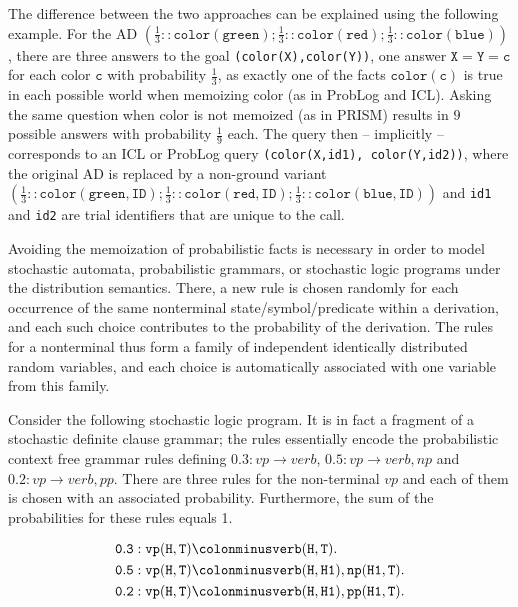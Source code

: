 \documentclass[a4paper]{article}
\begin{document}
The difference between the two approaches can be explained using the following 
example. 
For the AD $( \frac{1}{3}::\mathtt{color(green)} ;
 \frac{1}{3}::\mathtt{color(red)} ;
 \frac{1}{3}::\mathtt{color(blue)})$, there are three answers to the
 goal \texttt{(color(X),color(Y))}, one answer $\mathtt{X}=\mathtt{Y}=\mathtt{c}$ for each color
 $\mathtt{c}$ with probability $\frac{1}{3}$, as exactly one of the facts
 $\mathtt{color(c)}$ is true in each possible world when memoizing color (as in ProbLog and ICL). 
Asking the same question when color is not memoized (as in PRISM) results in $9$ possible answers with
 probability $\frac{1}{9}$ each. The query then -- implicitly --
 corresponds to an ICL or ProbLog query \texttt{(color(X,id1),
   color(Y,id2))}, where the original AD is replaced by a non-ground variant $( \frac{1}{3}::\mathtt{color(green,ID)} ;
 \frac{1}{3}::\mathtt{color(red,ID)} ;
 \frac{1}{3}::\mathtt{color(blue,ID)})$ and 
 \texttt{id1} and \texttt{id2} are trial identifiers that are unique
 to the call.

Avoiding the memoization of probabilistic facts is necessary in order to  
model stochastic automata, probabilistic grammars, or stochastic logic programs \citep{Muggleton:96} under the distribution semantics.
There, a new rule is chosen randomly for each occurrence of the same nonterminal state/symbol/predicate within a derivation, and each such choice contributes to the probability of the derivation. The rules for a nonterminal thus form a family of independent identically distributed random variables, and each choice is automatically associated with one variable from this family.

Consider the following stochastic logic program. It is in fact a fragment of a stochastic definite clause
grammar;  the rules essentially encode the probabilistic context free grammar rules defining $0.3: vp \rightarrow verb$, 
$0.5: vp \rightarrow verb, np$ and $0.2: vp \rightarrow verb, pp$. There are three rules for the non-terminal $vp$
and each of them is chosen with an associated probability. Furthermore, the sum of the probabilities for these rules equals 1.

\begin{align*}
\mathtt{0.3: vp(H,T)}&\colonminus \mathtt{  verb(H,T).}\\
\mathtt{0.5: vp(H,T)}&\colonminus \mathtt{  verb(H,H1),np(H1,T).}\\
\mathtt{0.2: vp(H,T)}&\colonminus \mathtt{  verb(H,H1),pp(H1,T).}\\
\end{align*}
\end{document}
